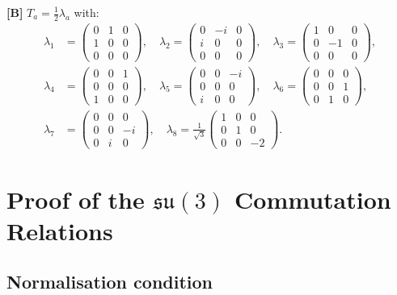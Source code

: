 \textbf{[B]} $T_a = \frac{1}{2}\lambda_a$ with:
\begin{align}
  \lambda_1 &=
  \begin{pmatrix}0&1&0\\1&0&0\\0&0&0\end{pmatrix},\quad
  \lambda_2 =
  \begin{pmatrix}0&{-i}&0\\i&0&0\\0&0&0\end{pmatrix},\quad
  \lambda_3 =
  \begin{pmatrix}1&0&0\\0&{-1}&0\\0&0&0\end{pmatrix},\nonumber\\
  \lambda_4 &=
  \begin{pmatrix}0&0&1\\0&0&0\\1&0&0\end{pmatrix},\quad
  \lambda_5 =
  \begin{pmatrix}0&0&{-i}\\0&0&0\\i&0&0\end{pmatrix},\quad
  \lambda_6 =
  \begin{pmatrix}0&0&0\\0&0&1\\0&1&0\end{pmatrix},\nonumber\\
  \lambda_7 &=
  \begin{pmatrix}0&0&0\\0&0&{-i}\\0&i&0\end{pmatrix},\quad
  \lambda_8 = \tfrac{1}{\sqrt{3}}
  \begin{pmatrix}1&0&0\\0&1&0\\0&0&{-2}\end{pmatrix}.
  \label{eq:gellmann}
\end{align}

\section{Proof of the $\mathfrak{su}(3)$ Commutation Relations}

\subsection{Normalisation condition}

